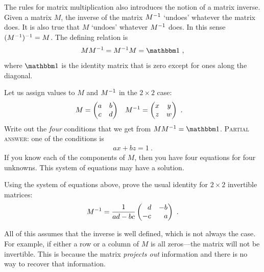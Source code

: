 The rules for matrix multiplication also introduces the notion of a matrix inverse. Given a matrix $M$, the inverse of the matrix $M^{-1}$ `undoes' whatever the matrix does. It is also true that $M$ `undoes' whatever $M^{-1}$ does. In this sense $(M^{-1})^{-1} = M$. The defining relation is
\begin{align}
    M M\inv = M\inv M = \one \ ,
    \label{eq:matrix:invers:multiplcation:notation}
\end{align}
where $\one$ is the identity matrix that is zero except for ones along the diagonal.
\begin{exercise}\label{ex:matrix:inversino:the:hard:way}
Let us assign values to $M$ and $M^{-1}$ in the $2\times 2$ case:
\begin{align}
M &=
    \begin{pmatrix}
    a & b \\
    c & d    
    \end{pmatrix}
    &
M^{-1} &=
    \begin{pmatrix}
    x & y \\
    z & w    
    \end{pmatrix} \ .
\end{align}
Write out the \emph{four} conditions that we get from $MM\inv = \one$. \textsc{Partial answer}: one of the conditions is
\begin{align}
    ax + bz = 1 \ .
\end{align}
If you know each of the components of $M$, then you have four equations for four unknowns. This system of equations may have a solution.
\end{exercise}
\begin{exercise}
Using the system of equations above, prove the usual identity for $2\times 2$ invertible matrices:
\begin{align}
    M\inv = \frac{1}{ad-bc}
    \begin{pmatrix}
    \pp d & -b \\
    -c & \pp a    
    \end{pmatrix} \ .
\end{align}
\end{exercise}
All of this assumes that the inverse is well defined, which is not always the case. For example, if either a row or a column of $M$ is all zeros---the matrix will not be invertible. This is because the matrix \emph{projects out} information and there is no way to recover that information.



